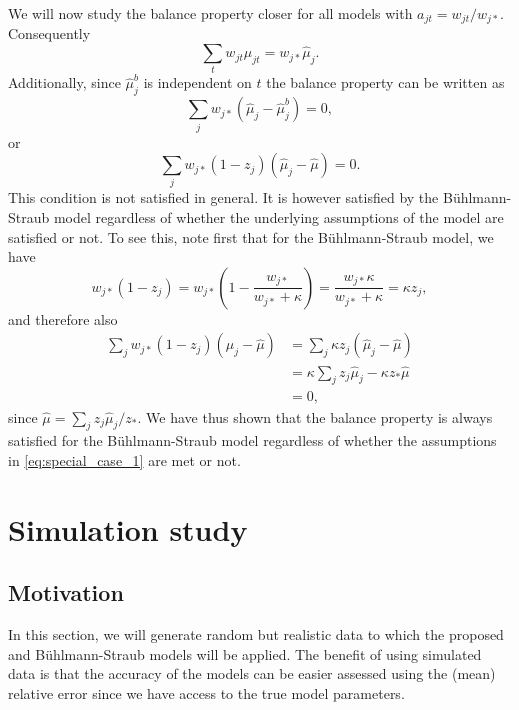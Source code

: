 \documentclass[11pt]{article}
\theoremstyle{definition}
\begin{document}
We will now study the balance property closer for all models with $a_{jt}=w_{jt}/w_{j\ast}$. Consequently
\begin{equation*}
    \sum_t w_{jt}\mu_{jt} = w_{j\ast}\hat\mu_j.
\end{equation*}
Additionally, since $\hat\mu_j^b$ is independent on $t$ the balance property can be written as
\begin{equation*}
    \sum_j w_{j\ast}(\hat\mu_j - \hat\mu_j^b) = 0,
\end{equation*}
or
\begin{equation*}
    \sum_j w_{j\ast}(1-z_j)(\hat\mu_j - \hat\mu) = 0.
\end{equation*}
This condition is not satisfied in general. It is however satisfied by the Bühlmann-Straub model regardless of whether the underlying assumptions of the model are satisfied or not. To see this, note first that for the Bühlmann-Straub model, we have
\begin{equation*}
    w_{j\ast}(1-z_j)=w_{j\ast}\left(1 - \frac{w_{j\ast}}{w_{j\ast}+\kappa} \right) = \frac{w_{j\ast}\kappa}{w_{j\ast}+\kappa} = \kappa z_j,
\end{equation*}
and therefore also
\begin{equation*}
    \begin{aligned}
         \sum_j w_{j\ast}(1-z_j)(\hat\mu_j - \hat\mu) &= \sum_j \kappa z_j (\hat\mu_j - \hat\mu) \\
         &= \kappa \sum_j z_j\hat\mu_j - \kappa z_\ast \hat\mu \\
         &= 0,
    \end{aligned}
\end{equation*}
since $\hat\mu = \sum_j z_j \hat\mu_j / z_\ast$. We have thus shown that the balance property is always satisfied for the Bühlmann-Straub model regardless of whether the assumptions in \eqref{eq:special_case_1} are met or not.

\newpage
\section{Simulation study}
\subsection{Motivation}\label{sec:sim_motiv}
In this section, we will generate random but realistic data to which the proposed and Bühlmann-Straub models will be applied. The benefit of using simulated data is that the accuracy of the models can be easier assessed using the (mean) relative error since we have access to the true model parameters.
\end{document}
